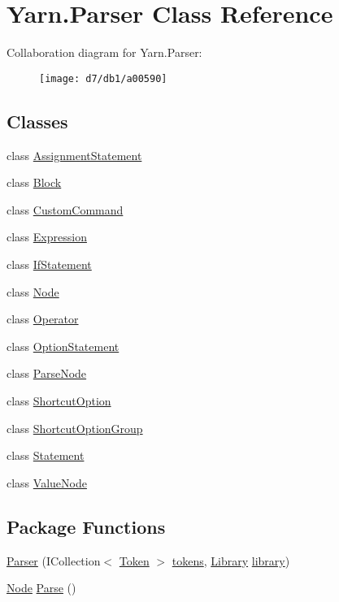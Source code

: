 \hypertarget{a00123}{\section{Yarn.\-Parser Class Reference}
\label{a00123}
}


Collaboration diagram for Yarn.\-Parser\-:
\nopagebreak
\begin{figure}[H]
\begin{center}
\leavevmode
\texttt{[image: d7/db1/a00590]}
\end{center}
\end{figure}
\subsection*{Classes}
\begin{DoxyCompactItemize}
\item 
class \hyperlink{a00020}{Assignment\-Statement}
\item 
class \hyperlink{a00024}{Block}
\item 
class \hyperlink{a00063}{Custom\-Command}
\item 
class \hyperlink{a00082}{Expression}
\item 
class \hyperlink{a00094}{If\-Statement}
\item 
class \hyperlink{a00112}{Node}
\item 
class \hyperlink{a00117}{Operator}
\item 
class \hyperlink{a00120}{Option\-Statement}
\item 
class \hyperlink{a00122}{Parse\-Node}
\item 
class \hyperlink{a00135}{Shortcut\-Option}
\item 
class \hyperlink{a00136}{Shortcut\-Option\-Group}
\item 
class \hyperlink{a00142}{Statement}
\item 
class \hyperlink{a00164}{Value\-Node}
\end{DoxyCompactItemize}
\subsection*{Package Functions}
\begin{DoxyCompactItemize}
\item 
\hyperlink{a00123_acd2714b911fb5e7c38f0e07a9dc1af58}{Parser} (I\-Collection$<$ \hyperlink{a00149}{Token} $>$ \hyperlink{a00123_a1a4de646937057988b59d2ff8035eae3}{tokens}, \hyperlink{a00103}{Library} \hyperlink{a00123_a1313951b09177a1c83b6cf035139197a}{library})
\item 
\hyperlink{a00112}{Node} \hyperlink{a00123_a811cc7226f4f4a2f3440cdb67ad14468}{Parse} ()
\end{DoxyCompactItemize}
